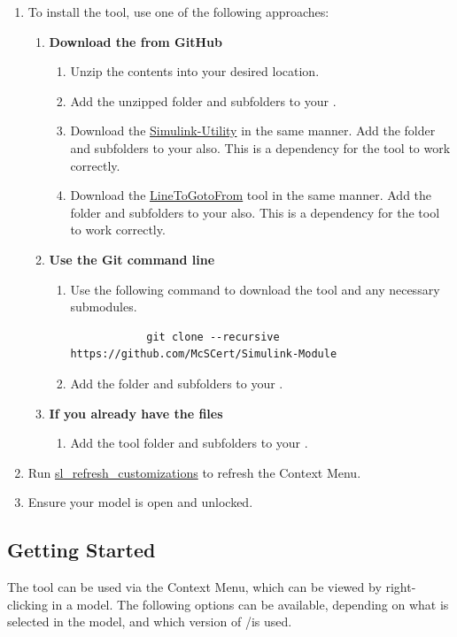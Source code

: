 \documentclass{article}
\begin{document}
\begin{enumerate}
	\item To install the tool, use one of the following approaches:
	\begin{enumerate}
		\item \textbf{Download the  from GitHub}
		\begin{enumerate} 
			\item Unzip the contents into your desired location. 
			\item Add the unzipped folder and subfolders to your \mpath. 
			\item Download the \href{https://github.com/McSCert/Simulink-Utility}{Simulink-Utility} in the same manner. Add the folder and subfolders to your \mpath also. This is a dependency for the tool to work correctly.
				\item Download the \href{https://github.com/McSCert/LineToGotoFrom}{LineToGotoFrom} tool in the same manner. Add the folder and subfolders to your \mpath also. This is a dependency for the tool to work correctly.
		\end{enumerate}
		\item \textbf{Use the Git command line}
		\begin{enumerate}
			\item Use the following command to download the tool and any necessary submodules. 
			\begin{verbatim}
			git clone --recursive https://github.com/McSCert/Simulink-Module
			\end{verbatim}
			\item Add the folder and subfolders to your \mpath. 
		\end{enumerate}
		\item \textbf{If you already have the files}
		\begin{enumerate}
			\item Add the tool folder and subfolders to your \mpath. 
		\end{enumerate}
	\end{enumerate}
	\item Run \href{https://www.mathworks.com/help/simulink/ug/registering-customizations.html}{sl\_refresh\_customizations} to refresh the Context Menu. 
	\item Ensure your model is open and unlocked.
\end{enumerate}

\subsection{Getting Started}
The tool can be used via the \Simulink Context Menu, which can be viewed by right-clicking in a model. The following options can be available, depending on what is selected in the model, and which version of \Matlab/\Simulink is used.
\end{document}
